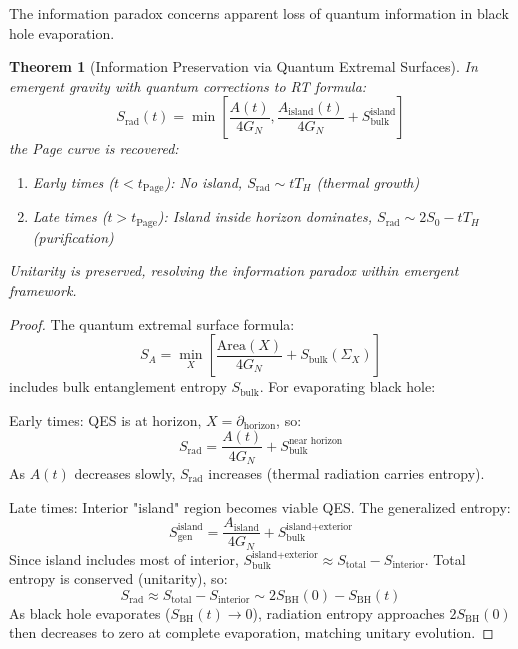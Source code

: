 \documentclass[11pt,a4paper]{article}
\newtheorem{theorem}{Theorem}[section]
\theoremstyle{remark}
\theoremstyle{definition}
\begin{document}
The information paradox concerns apparent loss of quantum information in black hole evaporation.

\begin{theorem}[Information Preservation via Quantum Extremal Surfaces]
\label{thm:information_preservation}
In emergent gravity with quantum corrections to RT formula:
\begin{equation}
S_{\text{rad}}(t) = \min\left[\frac{A(t)}{4G_N}, \frac{A_{\text{island}}(t)}{4G_N} + S_{\text{bulk}}^{\text{island}}\right]
\end{equation}
the Page curve is recovered:
\begin{enumerate}[label=(\roman*)]
\item Early times ($t < t_{\text{Page}}$): No island, $S_{\text{rad}} \sim t T_H$ (thermal growth)
\item Late times ($t > t_{\text{Page}}$): Island inside horizon dominates, $S_{\text{rad}} \sim 2S_0 - t T_H$ (purification)
\end{enumerate}
Unitarity is preserved, resolving the information paradox within emergent framework.
\end{theorem}

\begin{proof}
The quantum extremal surface formula:
\begin{equation}
S_A = \min_X\left[\frac{\text{Area}(X)}{4G_N} + S_{\text{bulk}}(\Sigma_X)\right]
\end{equation}
includes bulk entanglement entropy $S_{\text{bulk}}$. For evaporating black hole:

Early times: QES is at horizon, $X = \partial_{\text{horizon}}$, so:
\begin{equation}
S_{\text{rad}} = \frac{A(t)}{4G_N} + S_{\text{bulk}}^{\text{near horizon}}
\end{equation}
As $A(t)$ decreases slowly, $S_{\text{rad}}$ increases (thermal radiation carries entropy).

Late times: Interior "island" region becomes viable QES. The generalized entropy:
\begin{equation}
S_{\text{gen}}^{\text{island}} = \frac{A_{\text{island}}}{4G_N} + S_{\text{bulk}}^{\text{island}+\text{exterior}}
\end{equation}
Since island includes most of interior, $S_{\text{bulk}}^{\text{island}+\text{exterior}} \approx S_{\text{total}} - S_{\text{interior}}$. Total entropy is conserved (unitarity), so:
\begin{equation}
S_{\text{rad}} \approx S_{\text{total}} - S_{\text{interior}} \sim 2S_{\text{BH}}(0) - S_{\text{BH}}(t)
\end{equation}
As black hole evaporates ($S_{\text{BH}}(t) \to 0$), radiation entropy approaches $2S_{\text{BH}}(0)$ then decreases to zero at complete evaporation, matching unitary evolution.
\end{proof}
\end{document}

